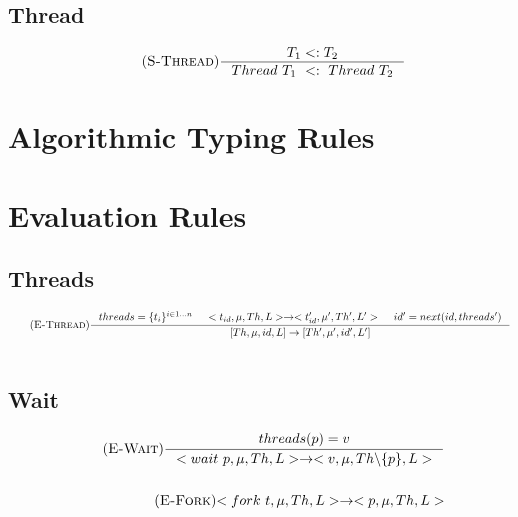 \documentclass[12pt]{article}
\begin{document}
\subsection{Thread}
\begin{align*}
    \tag {\textsc{S-Thread}}
    \inference[]{T_1 <: T_2}{ Thread~T_1~<:~Thread~T_2}
\end{align*}

\section{Algorithmic Typing Rules}


\section{Evaluation Rules}

\subsection{Threads}
\begin{align*}
    \tag{\textsc{E-Thread}}
    \inference[]{threads = \{t_i\}^{i\in 1...n} & <t_{id},\mu,Th,L> -> <t_{id}',\mu',Th',L'> & id' = next(id,threads')}{[Th,\mu,id,L]->[Th',\mu',id',L']}
    \\
    \\
\end{align*}
\subsection{Wait}
\begin{align*}
    \tag {\textsc{E-Wait}}
    \inference{threads(p) = v}{<wait~p,\mu,Th,L> -> <v,\mu,Th\backslash\{p\},L>}
    \\
    \\
    \tag {\textsc{E-Fork}}
    {<fork\ t,\mu,Th, L>-> <p ,\mu, Th, L>}
\end{align*}
\end{document}
